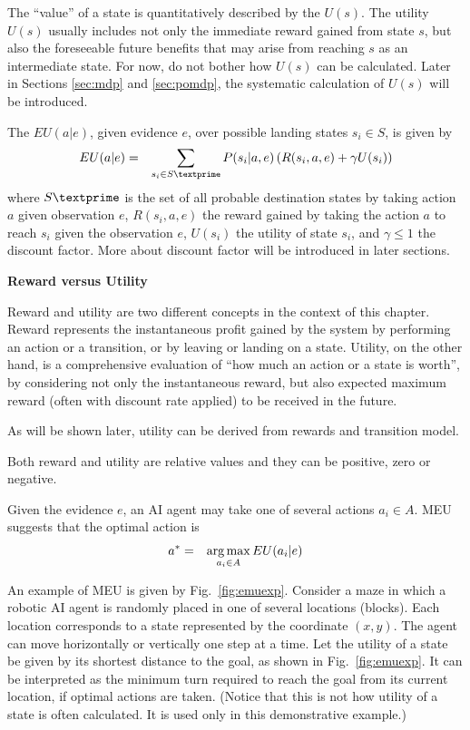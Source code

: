 The ``value'' of a state is quantitatively described by the  $U(s)$. The utility $U(s)$ usually includes not only the immediate reward gained from state $s$, but also the foreseeable future benefits that may arise from reaching $s$ as an intermediate state. For now, do not bother how $U(s)$ can be calculated. Later in Sections \ref{sec:mdp} and \ref{sec:pomdp}, the systematic calculation of $U(s)$ will be introduced.

The  $EU(a|e)$, given evidence $e$, over possible landing states $s_i \in S$, is given by
\begin{eqnarray}
	EU(a|e) &=& \sum_{s_i \in S\textprime} P(s_i|a,e) \left(R(s_i,a,e) + \gamma U(s_i)\right) \label{eq:expected_utility}
\end{eqnarray}
where $S\textprime$ is the set of all probable destination states by taking action $a$ given observation $e$, $R(s_i,a,e)$ the reward gained by taking the action $a$ to reach $s_i$ given the observation $e$, $U(s_i)$ the utility of state $s_i$, and $\gamma \leq 1$ the discount factor. More about discount factor will be introduced in later sections. 

\begin{mdframed}
\noindent \textbf{Reward versus Utility}

Reward and utility are two different concepts in the context of this chapter. Reward represents the instantaneous profit gained by the system by performing an action or a transition, or by leaving or landing on a state. Utility, on the other hand, is a comprehensive evaluation of ``how much an action or a state is worth'', by considering not only the instantaneous reward, but also expected maximum reward (often with discount rate applied) to be received in the future. 

As will be shown later, utility can be derived from rewards and transition model.

Both reward and utility are relative values and they can be positive, zero or negative.

\end{mdframed}


Given the evidence $e$, an AI agent may take one of several actions $a_i \in A$. MEU suggests that the optimal action is
\begin{eqnarray}
	a^* &=& \operatorname*{arg\,max}_{a_i \in A} EU(a_i|e) \label{eq:emu}
\end{eqnarray}

An example of MEU is given by Fig.~\ref{fig:emuexp}. Consider a maze in which a robotic AI agent is randomly placed in one of several locations (blocks). Each location corresponds to a state represented by the coordinate $(x,y)$. The agent can move horizontally or vertically one step at a time. Let the utility of a state be given by its shortest distance to the goal, as shown in Fig.~\ref{fig:emuexp}. It can be interpreted as the minimum turn required to reach the goal from its current location, if optimal actions are taken. (Notice that this is not how utility of a state is often calculated. It is used only in this demonstrative example.)

